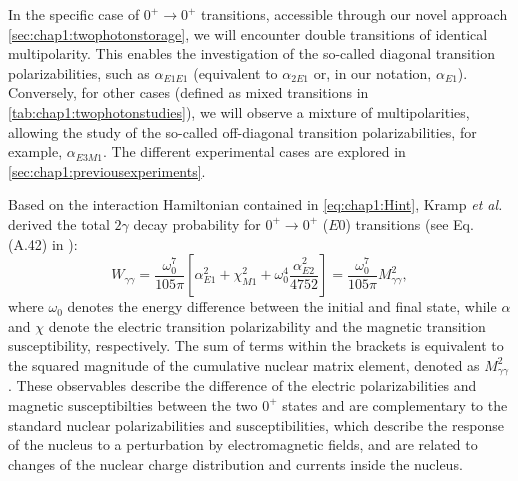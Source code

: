 In the specific case of \(0^{+} \rightarrow 0^{+}\) transitions, accessible through our novel approach \cref{sec:chap1:twophotonstorage}, we will encounter double transitions of identical multipolarity. This enables the investigation of the so-called diagonal transition polarizabilities, such as \(\alpha_{E1E1}\) (equivalent to \(\alpha_{2E1}\) or, in our notation, \(\alpha_{E1}\)). Conversely, for other cases (defined as mixed transitions in \cref{tab:chap1:twophotonstudies}), we will observe a mixture of multipolarities, allowing the study of the so-called off-diagonal transition polarizabilities, for example, \(\alpha_{E3M1}\). The different experimental cases are explored in \cref{sec:chap1:previousexperiments}.

Based on the interaction Hamiltonian contained in \cref{eq:chap1:Hint}, Kramp {\it et al.}\,\cite{Kramp-1987} derived the total $2\gamma$ decay probability for $0^{+}\rightarrow0^{+}$ ($E0$) transitions (see Eq.\,(A.42) in \cite{Kramp-1987}):
\begin{equation}
  W_{\gamma\gamma}=\frac{\omega_0^{7}}{105\pi}\left[\alpha_{E1}^{2}+\chi_{M1}^{2}+\omega_0^{4}\frac{\alpha_{E2}^{2}}{4752}\right] = \frac{\omega_0^{7}}{105\pi}M_{\gamma\gamma}^{2},
  \label{eq:chap1:2gd}
\end{equation}
where $\omega_0$ denotes the energy difference between the initial and final state, while 
$\alpha$ and $\chi$ denote the electric transition polarizability and the magnetic transition susceptibility, respectively. The sum of terms within the brackets is equivalent to the squared magnitude of the cumulative nuclear matrix element, denoted as $M_{\gamma\gamma}^{2}$.
These observables describe the difference of the electric polarizabilities and magnetic susceptibilties between the two $0^{+}$ states and are complementary to the standard nuclear polarizabilities and susceptibilities, which describe the response of the nucleus to a perturbation by electromagnetic fields, and are related to changes  of the nuclear charge distribution and currents inside the nucleus.


